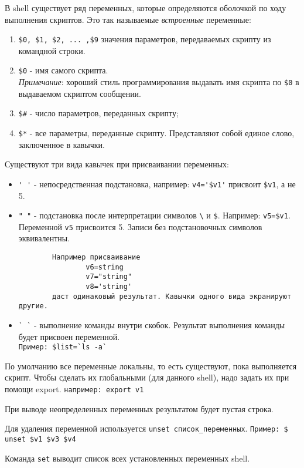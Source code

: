 В shell существует ряд переменных, которые определяются оболочкой по ходу выполнения скриптов. Это так называемые \emph{встроенные} переменные:
\begin{enumerate}
	\item \verb+$0, $1, $2, ... ,$9+  значения параметров, передаваемых скрипту из командной строки. 
	\item \verb+$0+  - имя самого скрипта.\\
		\emph{Примечание}: хороший стиль программирования  выдавать имя скрипта по \verb+$0+ в выдаваемом скриптом сообщении.
	\item \verb+$#+ - число параметров, переданных скрипту;
	\item \verb+$*+ - все параметры, переданные скрипту. Представляют собой единое слово, заключенное в кавычки.
\end{enumerate}

Существуют три вида кавычек при присваивании переменных:
\begin{itemize}
	\item \verb+' '+ - непосредственная  подстановка,  например: \verb+v4='$v1'+  присвоит  \verb+$v1+, а не 5.
	\item \verb+" "+ - подстановка после интерпретации символов \verb+\+ и \verb+$+. Например: \verb+v5=$v1+. Переменной \verb+v5+ присвоится 5.
		Записи без подстановочных символов эквивалентны. 
		\begin{verbatim}
		Например присваивание
        		v6=string
        		v7="string"
        		v8='string'
		даст одинаковый результат. Кавычки одного вида экранируют другие.
		\end{verbatim}
	\item \verb+` `+ - выполнение команды внутри скобок. Результат выполнения команды будет присвоен переменной.\\
	\verb+Пример: $list=`ls -a`+
\end{itemize}

По умолчанию все переменные локальны, то есть существуют, пока выполняется скрипт. Чтобы сделать их глобальными (для данного shell), надо задать их при помощи export. \verb+например: export v1+

При выводе неопределенных переменных результатом будет пустая строка.

Для удаления переменной используется \verb+unset список_переменных+. \verb+Пример: $ unset $v1 $v3 $v4+

Команда \verb+set+ выводит список всех установленных переменных shell.


